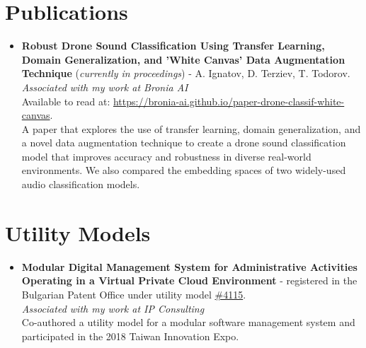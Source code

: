 \documentclass[11pt,a4paper]{article}
\begin{document}
\section{Publications}
\begin{itemize}[leftmargin=*]
    \item \textbf{Robust Drone Sound Classification Using Transfer
    Learning, Domain Generalization, and 'White
    Canvas' Data Augmentation Technique} (\textit{currently in proceedings}) - A. Ignatov, D. Terziev, T. Todorov. \\
    \textit{Associated with my work at Bronia AI} \\
    Available to read at: \href{https://bronia-ai.github.io/paper-drone-classif-white-canvas/}{https://bronia-ai.github.io/paper-drone-classif-white-canvas}. \\
    A paper that explores the use of transfer learning, domain generalization, and a novel data augmentation technique
    to create a drone sound classification model that improves accuracy and robustness in diverse real-world environments.
    We also compared the embedding spaces of two widely-used audio classification models.
\end{itemize}

\section{Utility Models}
\begin{itemize}[leftmargin=*]
    \item \textbf{Modular Digital Management System for Administrative Activities Operating in a Virtual Private Cloud Environment} - registered in the Bulgarian Patent Office under utility model \href{https://portal.bpo.bg/rd?key=2018004115U}{\#4115}. \\
    \textit{Associated with my work at IP Consulting} \\
    Co-authored a utility model for a modular software management system and participated in the 2018 Taiwan Innovation Expo.
\end{itemize}
\end{document}

